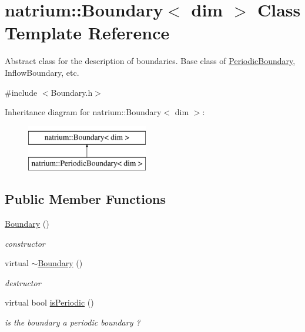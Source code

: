 \hypertarget{classnatrium_1_1Boundary}{\section{natrium\-:\-:Boundary$<$ dim $>$ Class Template Reference}
\label{classnatrium_1_1Boundary}
}


Abstract class for the description of boundaries. Base class of \hyperlink{classnatrium_1_1PeriodicBoundary}{Periodic\-Boundary}, Inflow\-Boundary, etc.  




{\ttfamily \#include $<$Boundary.\-h$>$}

Inheritance diagram for natrium\-:\-:Boundary$<$ dim $>$\-:\begin{figure}[H]
\begin{center}
\leavevmode
\includegraphics[height=2.000000cm]{classnatrium_1_1Boundary}
\end{center}
\end{figure}
\subsection*{Public Member Functions}
\begin{DoxyCompactItemize}
\item 
\hypertarget{classnatrium_1_1Boundary_a987978143b16ef0bbadd2b465dc1882d}{\hyperlink{classnatrium_1_1Boundary_a987978143b16ef0bbadd2b465dc1882d}{Boundary} ()}\label{classnatrium_1_1Boundary_a987978143b16ef0bbadd2b465dc1882d}

\begin{DoxyCompactList}\small\item\em constructor \end{DoxyCompactList}\item 
\hypertarget{classnatrium_1_1Boundary_a63e8fb8ec44288b9145f819b515ae6d9}{virtual \hyperlink{classnatrium_1_1Boundary_a63e8fb8ec44288b9145f819b515ae6d9}{$\sim$\-Boundary} ()}\label{classnatrium_1_1Boundary_a63e8fb8ec44288b9145f819b515ae6d9}

\begin{DoxyCompactList}\small\item\em destructor \end{DoxyCompactList}\item 
\hypertarget{classnatrium_1_1Boundary_aaa9472e5b03f1695a390b8a0abe50b9b}{virtual bool \hyperlink{classnatrium_1_1Boundary_aaa9472e5b03f1695a390b8a0abe50b9b}{is\-Periodic} ()}\label{classnatrium_1_1Boundary_aaa9472e5b03f1695a390b8a0abe50b9b}

\begin{DoxyCompactList}\small\item\em is the boundary a periodic boundary ? \end{DoxyCompactList}\end{DoxyCompactItemize}


